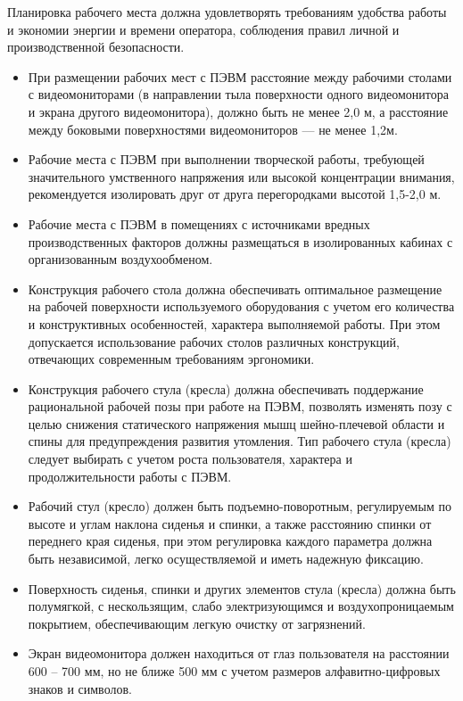 Планировка рабочего места должна удовлетворять требованиям удобства работы и экономии энергии и времени оператора, соблюдения правил личной и производственной безопасности.
\begin{itemize}
  \item При размещении рабочих мест с ПЭВМ расстояние между рабочими столами с видеомониторами (в направлении тыла поверхности одного видеомонитора и экрана другого видеомонитора), должно быть не менее 2,0 м, а расстояние между боковыми поверхностями видеомониторов --- не менее 1,2м.
  \item Рабочие места с ПЭВМ при выполнении творческой работы, требующей значительного умственного напряжения или высокой концентрации внимания, рекомендуется изолировать друг от друга перегородками высотой 1,5-2,0 м.
  \item Рабочие места с ПЭВМ в помещениях с источниками вредных производственных факторов должны размещаться в изолированных кабинах с организованным воздухообменом.
  \item Конструкция рабочего стола должна обеспечивать оптимальное размещение на рабочей поверхности используемого оборудования с учетом его количества и конструктивных особенностей, характера выполняемой работы. При этом допускается использование рабочих столов различных конструкций, отвечающих современным требованиям эргономики.
  \item Конструкция рабочего стула (кресла) должна обеспечивать поддержание рациональной рабочей позы при работе на ПЭВМ, позволять изменять позу с целью снижения статического напряжения мышц шейно-плечевой области и спины для предупреждения развития утомления. Тип рабочего стула (кресла) следует выбирать с учетом роста пользователя, характера и продолжительности работы с ПЭВМ.
  \item Рабочий стул (кресло) должен быть подъемно-поворотным, регулируемым по высоте и углам наклона сиденья и спинки, а также расстоянию спинки от переднего края сиденья, при этом регулировка каждого параметра должна быть независимой, легко осуществляемой и иметь надежную фиксацию.
  \item Поверхность сиденья, спинки и других элементов стула (кресла) должна быть полумягкой, с нескользящим, слабо электризующимся и воздухопроницаемым покрытием, обеспечивающим легкую очистку от загрязнений.
  \item Экран видеомонитора должен находиться от глаз пользователя на расстоянии 600 -- 700 мм, но не ближе 500 мм с учетом размеров алфавитно-цифровых знаков и символов.
\end{itemize}

